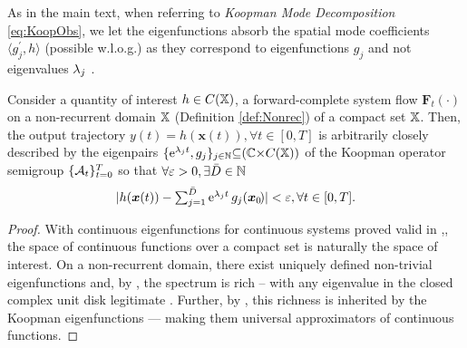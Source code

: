 As in the main text, when referring to \textit{Koopman Mode Decomposition} \eqref{eq:KoopObs}, we let the eigenfunctions absorb the spatial mode coefficients $\langle{ g^\prime_j,h}\rangle$ (possible w.l.o.g.) as they correspond to eigenfunctions $g_j$ and not eigenvalues $\lambda_j$ \cite[Definition 9]{Budisic2012AppliedKoopmanism}.
\begin{lemma}\label{lem:universal}
    Consider a quantity of interest $h \in C(\mathbb{X})$, a forward-complete system flow $\bm{F}_{t}(\cdot)$ on a non-recurrent domain $\mathbb{X}$ (Definition \ref{def:Nonrec}) of a compact set $\mathbb{X}$. Then, the output trajectory ${y}(t) = {h}(\bm{x}(t)), \forall t \in [0,T]$ is arbitrarily closely described by the eigenpairs $\{\operatorname{e}^{\lambda_j t},g_j\}_{j \in \mathbb{N}} {\subseteq} (\mathbb{C} {\times} C(\mathbb{X}))$ of the Koopman operator semigroup $\{\mathcal{A}_t\}^{T}_{t{=}0}$ so that $\forall \varepsilon > 0, \exists \bar{D} \in \mathbb{N}$
    \begin{equation}\label{modeDecom}
 |{h}(\bm{x}(t)) - \textstyle{\sum^{\bar{D}}_{j =1}}\operatorname{e}^{\lambda_j t} g_j (\bm{x}{_{{0\!}}}) | < \varepsilon, \forall t \in [0,T].
    \end{equation}
\end{lemma}
\begin{proof}
With continuous eigenfunctions for continuous systems proved valid in \cite[Lemma 5.1]{Mezic2020SpectrumGeometry},\cite[Theorem 1]{Korda2020OptimalControl}, the space of continuous functions over a compact set is naturally the space of interest. On a non-recurrent domain, there exist uniquely defined non-trivial eigenfunctions and, by \cite[Theorem 3.0.2]{Kuster2015TheSystems}, the spectrum is rich -- with any eigenvalue in the closed complex unit disk legitimate \citep{Ikeda2022KoopmanSpaces}. Further, by \cite[Theorem 2]{Korda2020OptimalControl}, this richness is inherited by the Koopman eigenfunctions --- making them universal approximators of continuous functions.
\end{proof}
